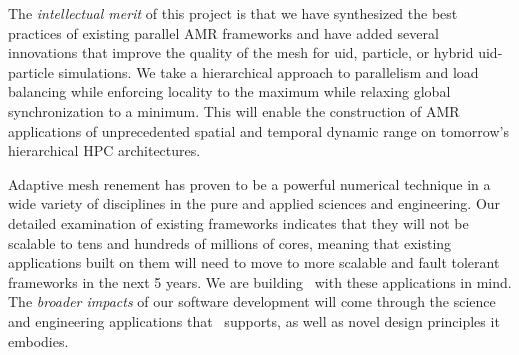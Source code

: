 \documentclass[11pt,letterpaper]{article}
\begin{document}


The \textit{intellectual merit} of this project is that we have
synthesized the best practices of existing parallel AMR frameworks and
have added several innovations that improve the quality of the mesh
for uid, particle, or hybrid uid-particle simulations. We take a
hierarchical approach to parallelism and load balancing while
enforcing locality to the maximum while relaxing global
synchronization to a minimum. This will enable the construction of AMR
applications of unprecedented spatial and temporal dynamic range on
tomorrow's hierarchical HPC architectures.







Adaptive mesh renement has proven to be a powerful numerical technique
in a wide variety of disciplines in the pure and applied sciences and
engineering. Our detailed examination of existing frameworks indicates
that they will not be scalable to tens and hundreds of millions of
cores, meaning that existing applications built on them will need to
move to more scalable and fault tolerant frameworks in the next 5
years. We are building \cello\ with these applications in mind.  The
\textit{broader impacts} of our software development will come through
the science and engineering applications that \cello\ supports, as well
as novel design principles it embodies.



\end{document}
